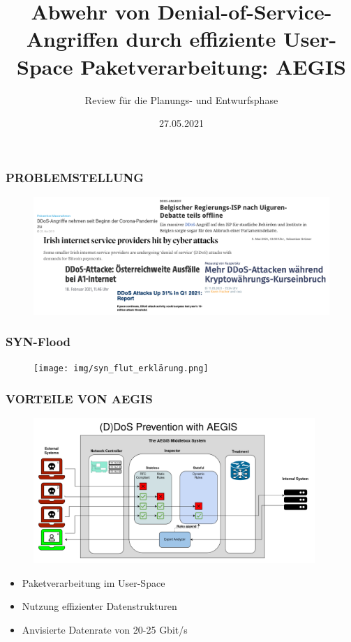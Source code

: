 \documentclass{beamer}
\title[Abwehr von Denial-of-Service-Angriffen durch effiziente User-Space Paketverarbeitung: AEGIS]{Abwehr von Denial-of-Service-Angriffen durch effiziente User-Space Paketverarbeitung: AEGIS}
\subtitle{Review für die Planungs- und Entwurfsphase}
\institute{Technische Universität Ilmenau}
\date{27.05.2021}
\begin{document}
\frame{\titlepage}
\begin{frame}
    \frametitle{PROBLEMSTELLUNG}
    \begin{figure}[ht]
        \centering
        \includegraphics[width=11.5cm]{img/zeitung.png}
    \end{figure}
\end{frame}


\begin{frame}
    \frametitle{SYN-Flood}
    \begin{figure}[ht]
        \centering
        \texttt{[image: img/syn\_flut\_erklärung.png]}
    \end{figure}
\end{frame}

\begin{frame}
    \frametitle{VORTEILE VON AEGIS}
    \begin{figure}[ht]
        \centering
        \includegraphics[height=5.5cm]{img/security_layers_vp_online.png}
    \end{figure}
    \vspace{-0.35cm}
    \begin{itemize}
        \item Paketverarbeitung im User-Space
        \item Nutzung effizienter Datenstrukturen
        \item Anvisierte Datenrate von 20-25 Gbit/s
    \end{itemize}
\end{frame}
\end{document}
